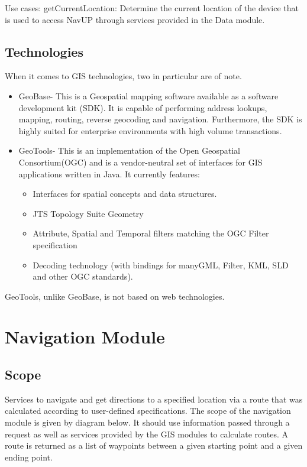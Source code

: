\documentclass[12pt]{article}
\begin{document}
Use cases:
getCurrentLocation: Determine the current location of the device that is used to access NavUP through services provided in the Data module.

\subsection{Technologies}
When it comes to GIS technologies, two in particular are of note. 
\begin{itemize}
\item GeoBase- This is a Geospatial mapping software available as a software development kit (SDK). It is capable of performing address lookups, mapping, routing, reverse geocoding and navigation. Furthermore, the SDK is highly suited for enterprise environments with high volume transactions.
\item GeoTools- This is an implementation of the Open Geospatial Consortium(OGC) and is a vendor-neutral set of interfaces for GIS applications written in Java. It currently features:
\begin{itemize}
\item Interfaces for spatial concepts and data structures.
\item JTS Topology Suite Geometry
\item Attribute, Spatial and Temporal filters matching the OGC Filter specification
\item Decoding technology (with bindings for manyGML, Filter, KML, SLD and other OGC standards).
\end{itemize}
\end{itemize}
GeoTools, unlike GeoBase, is not based on web technologies.

\section{Navigation Module}
\subsection{Scope}
Services to navigate and get directions to a specified location via a route that was calculated according to user-defined specifications. The scope of the navigation module is given by diagram below. It should use information passed through a request as well as services provided by the GIS modules to calculate routes. A route is returned  as a list of waypoints between a given starting point and a given ending point.
\end{document}
